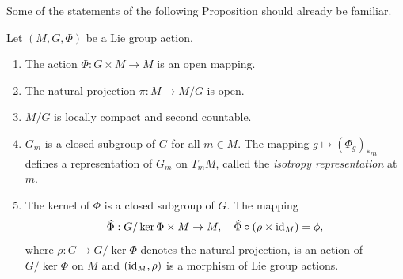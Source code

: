 Some of the statements of the following Proposition should already be familiar.

\begin{prop}[{{\cite[Prop.~6.1.5]{RS1}}}]\label{prop 6.1.5 RS1}
    Let $(M,G,\Phi)$ be a Lie group action.
    \begin{enumerate}
        \item The action $\Phi:G\times M\to M$ is an open mapping.
        \item The natural projection $\pi:M\to M\slash G$ is open.
        \item $M\slash G$ is locally compact and second countable.
        \item $G_m$ is a closed subgroup of $G$ for all $m\in M$. The mapping $g\mapsto (\Phi_g)_{\ast m}$ defines a representation of $G_m$ on $T_mM$, called the \emph{isotropy representation} at $m$.
        \item The kernel of $\Phi$ is a closed subgroup of $G$. The mapping
        \[\wh{\Phi}:G\slash \ker \Phi\times M\to M,\quad \wh{\Phi}\circ(\rho\times\id_M)=\phi,\]
        where $\rho:G\to G\slash\ker\Phi$ denotes the natural projection, is an action of $G\slash\ker\Phi$ on $M$ and $(\operatorname{id}_M,\rho)$ is a morphism of Lie group actions.
    \end{enumerate}
\end{prop}
